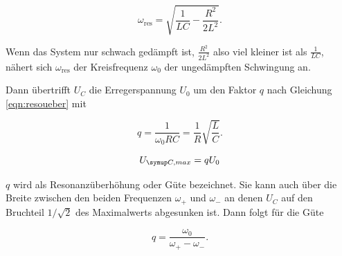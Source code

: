 \begin{equation}
  \omega_{\text{res}} = \sqrt{\frac{1}{LC} - \frac{R^2}{2L^2}}.
\end{equation}

Wenn das System nur schwach gedämpft ist, $\frac{R^2}{2L^2}$ also viel
kleiner ist als $\frac{1}{LC}$, nähert sich $\omega_{\text{res}}$ der
Kreisfrequenz $\omega_0$ der ungedämpften Schwingung an.

Dann übertrifft $U_C$ die Erregerspannung $U_0$ um den Faktor $q$ nach
Gleichung \eqref{eqn:resoueber} mit

\begin{equation}
  q = \frac{1}{\omega_0RC} = \frac{1}{R}\sqrt{\frac{L}{C}}.
\end{equation}

\begin{equation}
  U_{\g{C,max}} = q U_{\text{0}}
  \label{eqn:resoueber}
\end{equation}

$q$ wird als Resonanzüberhöhung oder Güte bezeichnet.
Sie kann auch über die Breite zwischen den beiden Frequenzen $\omega_+$
und $\omega_-$ an denen $U_C$ auf den Bruchteil $1/\sqrt{2}$ des
Maximalwerts abgesunken ist. Dann folgt für die Güte

\begin{equation}
  q = \frac{\omega_{\text{0}}}{\omega_+ - \omega_-}.
\end{equation}
